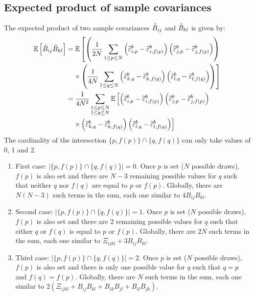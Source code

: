 \documentclass[12pt]{scrartcl}
\begin{document}
\subsection{Expected product of sample covariances}
The expected product of two sample covariances $\accentset{\circ}{B}_{ij}$ and $\accentset{\circ}{B}_{kl}$ is given by:
\begin{align}
\mathbb{E} \left[\accentset{\circ}{B}_{ij} \accentset{\circ}{B}_{kl}\right] & = \mathbb{E}\left[\left(\frac{1}{2N} \sum_{1 \le p \le N} \left(\widetilde{\varepsilon}^b_{i,p} - \widetilde{\varepsilon}^b_{i,f(p)}\right) \left(\widetilde{\varepsilon}^b_{j,p} - \widetilde{\varepsilon}^b_{j,f(p)}\right)\right) \right. \nonumber \\
& \left. \quad \times \left(\frac{1}{4N} \sum_{1 \le q \le N} \left(\widetilde{\varepsilon}^b_{k,q} - \widetilde{\varepsilon}^b_{k,f(q)}\right) \left(\widetilde{\varepsilon}^b_{l,q} - \widetilde{\varepsilon}^b_{l,f(q)}\right)\right) \right] \nonumber \\
& = \frac{1}{4N^2} \sum_{\substack{1 \le p \le N\\1 \le q \le N}} \mathbb{E}\left[\left(\widetilde{\varepsilon}^b_{i,p} - \widetilde{\varepsilon}^b_{i,f(p)}\right) \left(\widetilde{\varepsilon}^b_{j,p} - \widetilde{\varepsilon}^b_{j,f(p)}\right) \right. \nonumber \\
& \left. \quad \times \left(\widetilde{\varepsilon}^b_{k,q} - \widetilde{\varepsilon}^b_{k,f(q)}\right) \left(\widetilde{\varepsilon}^b_{l,q} - \widetilde{\varepsilon}^b_{l,f(q)}\right) \right]
\end{align}
The cardinality of the intersection $\{p,f(p)\} \cap \{q,f(q)\}$ can only take values of 0, 1 and 2.
\begin{enumerate}
\item First case: $|\{p,f(p)\} \cap \{q,f(q)\}| = 0$. Once $p$ is set ($N$ possible draws), $f(p)$ is also set and there are $N-3$ remaining possible values for $q$ such that neither $q$ nor $f(q)$ are equal to $p$ or $f(p)$. Globally, there are $\displaystyle N(N-3)$ such terms in the sum, each one similar to $4 B_{ij} B_{kl}$.
\item Second case: $|\{p,f(p)\} \cap \{q,f(q)\}| = 1$. Once $p$ is set ($N$ possible draws), $f(p)$ is also set and there are 2 remaining possible values for $q$ such that either $q$ or $f(q)$ is equal to $p$ or $f(p)$.  Globally, there are $\displaystyle 2N$ such terms in the sum, each one similar to $\Xi_{ijkl} + 3 B_{ij} B_{kl}$.
\item Third case: $|\{p,f(p)\} \cap \{q,f(q)\}| = 2$.  Once $p$ is set ($N$ possible draws), $f(p)$ is also set and there is only one possible value for $q$ such that $q = p$ and $f(q) = f(p)$.  Globally, there are $\displaystyle N$ such terms in the sum, each one similar to $2 \left(\Xi_{ijkl} + B_{ij} B_{kl} + B_{ik} B_{jl} + B_{il} B_{jk}\right)$.
\end{enumerate}
\end{document}
